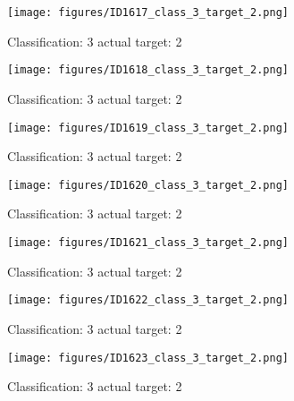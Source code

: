 \begin{figure}[h!]
\begin{center}
\texttt{[image: figures/ID1617\_class\_3\_target\_2.png]}
\end{center}
\caption{ Classification: 3 actual target: 2}
\label{fig:ID1617_class_3_target_2}
\end{figure}
\begin{figure}[h!]
\begin{center}
\texttt{[image: figures/ID1618\_class\_3\_target\_2.png]}
\end{center}
\caption{ Classification: 3 actual target: 2}
\label{fig:ID1618_class_3_target_2}
\end{figure}
\begin{figure}[h!]
\begin{center}
\texttt{[image: figures/ID1619\_class\_3\_target\_2.png]}
\end{center}
\caption{ Classification: 3 actual target: 2}
\label{fig:ID1619_class_3_target_2}
\end{figure}
\begin{figure}[h!]
\begin{center}
\texttt{[image: figures/ID1620\_class\_3\_target\_2.png]}
\end{center}
\caption{ Classification: 3 actual target: 2}
\label{fig:ID1620_class_3_target_2}
\end{figure}
\begin{figure}[h!]
\begin{center}
\texttt{[image: figures/ID1621\_class\_3\_target\_2.png]}
\end{center}
\caption{ Classification: 3 actual target: 2}
\label{fig:ID1621_class_3_target_2}
\end{figure}
\begin{figure}[h!]
\begin{center}
\texttt{[image: figures/ID1622\_class\_3\_target\_2.png]}
\end{center}
\caption{ Classification: 3 actual target: 2}
\label{fig:ID1622_class_3_target_2}
\end{figure}
\begin{figure}[h!]
\begin{center}
\texttt{[image: figures/ID1623\_class\_3\_target\_2.png]}
\end{center}
\caption{ Classification: 3 actual target: 2}
\label{fig:ID1623_class_3_target_2}
\end{figure}
